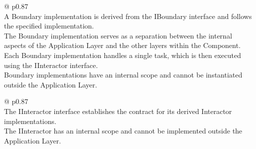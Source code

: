 \begin{table}[H]
    \begin{tabular}{@{\makebox[2em][c]{\rownumber\space}}  p{0.87\linewidth}}
        \\ 
    \hline
    A Boundary implementation is derived from the IBoundary interface and follows the
    specified implementation. \\

    The Boundary implementation serves as a separation between the internal aspects of the
    Application Layer and the other layers within the Component. \\
    
    Each Boundary implementation handles a single task, which is then
    executed using the IInteractor interface. \\
    
    Boundary implementations have an internal scope and cannot be instantiated outside the
    Application Layer. \\
    \hline
    \end{tabular}
\caption{Boundary Implementation Requirements}
\label{table_requirements_boundary}
\end{table}

\begin{table}[H]
    \begin{tabular}{@{\makebox[2em][c]{\rownumber\space}}  p{0.87\linewidth}}
        \\ 
    \hline
    The IInteractor interface establishes the contract for its derived Interactor
    implementations. \\

    The IInteractor has an internal scope and cannot be implemented outside the Application
    Layer. \\
    \hline
    \end{tabular}
\caption{IInteractor Requirements}
\label{table_requirements_iinteractor}
\end{table}

